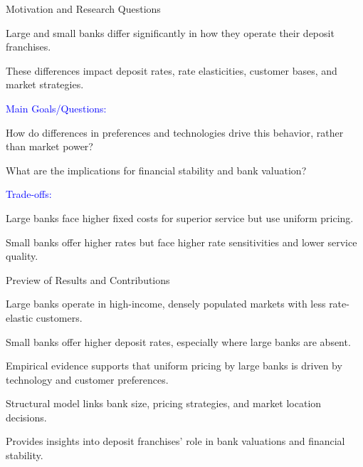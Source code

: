 \documentclass[notes,10pt, aspectratio=169]{beamer}
\newenvironment{wideitemize}{\itemize\addtolength{\itemsep}{10pt}}{\enditemize}
\begin{document}
\begin{frame}{Motivation and Research Questions}
    \begin{wideitemize}
        \item Large and small banks differ significantly in how they operate their deposit franchises.
        \item These differences impact deposit rates, rate elasticities, customer bases, and market strategies.
        \item \textcolor{blue}{Main Goals/Questions:}
        \vspace{0.2cm}
        \begin{wideitemize}
            \item How do differences in preferences and technologies drive this behavior, rather than market power?
            \item What are the implications for financial stability and bank valuation?
        \end{wideitemize}
        \item \textcolor{blue}{Trade-offs:}
        \vspace{0.2cm}
        \begin{wideitemize}
            \item Large banks face higher fixed costs for superior service but use uniform pricing.
            \item Small banks offer higher rates but face higher rate sensitivities and lower service quality.
        \end{wideitemize}
    \end{wideitemize}
    \end{frame}
    
    \begin{frame}{Preview of Results and Contributions}
    \begin{wideitemize}
        \item Large banks operate in high-income, densely populated markets with less rate-elastic customers.
        \item Small banks offer higher deposit rates, especially where large banks are absent.
        \item Empirical evidence supports that uniform pricing by large banks is driven by technology and customer preferences.
        \item Structural model links bank size, pricing strategies, and market location decisions.
        \item Provides insights into deposit franchises’ role in bank valuations and financial stability.
    \end{wideitemize}
    \end{frame}
    
\end{document}

